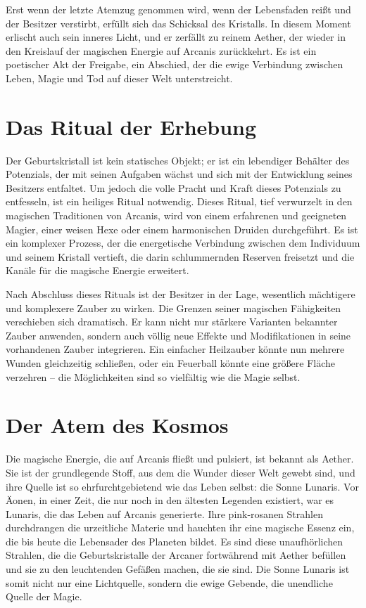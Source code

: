 \documentclass[10pt,a4paper,twocolumn,openany]{book}
\begin{document}
Erst wenn der letzte Atemzug genommen wird, wenn der Lebensfaden reißt und der Besitzer verstirbt, erfüllt sich das Schicksal des Kristalls. In diesem Moment erlischt auch sein inneres Licht, und er zerfällt zu reinem Aether, der wieder in den Kreislauf der magischen Energie auf Arcanis zurückkehrt. Es ist ein poetischer Akt der Freigabe, ein Abschied, der die ewige Verbindung zwischen Leben, Magie und Tod auf dieser Welt unterstreicht.

\section{Das Ritual der Erhebung}

Der Geburtskristall ist kein statisches Objekt; er ist ein lebendiger Behälter des Potenzials, der mit seinen Aufgaben wächst und sich mit der Entwicklung seines Besitzers entfaltet. Um jedoch die volle Pracht und Kraft dieses Potenzials zu entfesseln, ist ein heiliges Ritual notwendig. Dieses Ritual, tief verwurzelt in den magischen Traditionen von Arcanis, wird von einem erfahrenen und geeigneten Magier, einer weisen Hexe oder einem harmonischen Druiden durchgeführt. Es ist ein komplexer Prozess, der die energetische Verbindung zwischen dem Individuum und seinem Kristall vertieft, die darin schlummernden Reserven freisetzt und die Kanäle für die magische Energie erweitert.

Nach Abschluss dieses Rituals ist der Besitzer in der Lage, wesentlich mächtigere und komplexere Zauber zu wirken. Die Grenzen seiner magischen Fähigkeiten verschieben sich dramatisch. Er kann nicht nur stärkere Varianten bekannter Zauber anwenden, sondern auch völlig neue Effekte und Modifikationen in seine vorhandenen Zauber integrieren. Ein einfacher Heilzauber könnte nun mehrere Wunden gleichzeitig schließen, oder ein Feuerball könnte eine größere Fläche verzehren – die Möglichkeiten sind so vielfältig wie die Magie selbst.

\section{Der Atem des Kosmos}

Die magische Energie, die auf Arcanis fließt und pulsiert, ist bekannt als Aether. Sie ist der grundlegende Stoff, aus dem die Wunder dieser Welt gewebt sind, und ihre Quelle ist so ehrfurchtgebietend wie das Leben selbst: die Sonne Lunaris. Vor Äonen, in einer Zeit, die nur noch in den ältesten Legenden existiert, war es Lunaris, die das Leben auf Arcanis generierte. Ihre pink-rosanen Strahlen durchdrangen die urzeitliche Materie und hauchten ihr eine magische Essenz ein, die bis heute die Lebensader des Planeten bildet. Es sind diese unaufhörlichen Strahlen, die die Geburtskristalle der Arcaner fortwährend mit Aether befüllen und sie zu den leuchtenden Gefäßen machen, die sie sind. Die Sonne Lunaris ist somit nicht nur eine Lichtquelle, sondern die ewige Gebende, die unendliche Quelle der Magie.
\end{document}
